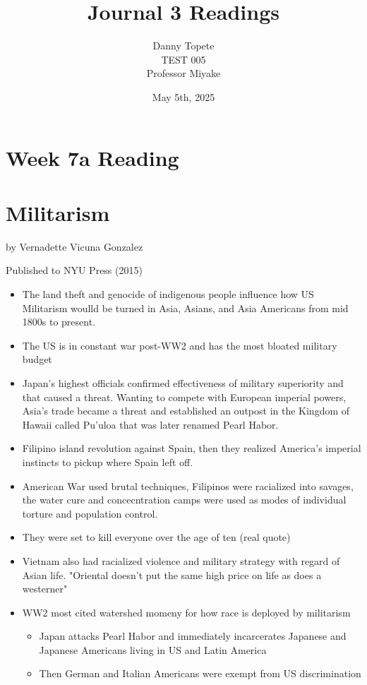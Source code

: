 \documentclass{article}
\title{Journal 3 Readings}
\author{Danny Topete\\ TEST 005\\ Professor Miyake}
\date{May 5th, 2025}
\begin{document}
\maketitle


  \section*{Week 7a Reading}
  \section{Militarism}
  by Vernadette Vicuna Gonzalez

  Published to NYU Press (2015)

  \begin{itemize}
    \item The land theft and genocide of indigenous people
      influence how US Militarism woulld be turned
      in Asia, Asians, and Asia Americans from mid 1800s to present.
    \item The US is in constant war post-WW2 and has the most bloated military budget
    \item Japan's highest officials confirmed
      effectiveness of military superiority and that caused a threat.
      Wanting to compete with European imperial powers, Asia's trade became a threat and
      established an outpost in the Kingdom of Hawaii called Pu'uloa that was
      later renamed Pearl Habor.
    \item Filipino island revolution against Spain, then they realized
      America's imperial instincts to pickup where Spain left off.
    \item American War used brutal techniques,
      Filipinos were racialized into savages, the water cure
      and concecntration camps were used as modes of individual torture and population control.
    \item They were set to kill everyone over the age of ten (real quote)
    \item Vietnam also had racialized violence and military strategy with
      regard of Asian life. "Oriental doesn't put the same high price on life as does a westerner"
    \item WW2 most cited watershed momeny for how race is deployed by militarism
      \begin{itemize}
        \item Japan attacks Pearl Habor and immediately incarcerates Japanese and Japanese Americans
          living in US and Latin America
        \item Then German and Italian Americans were exempt from US discrimination
      \end{itemize}
  \end{itemize}
\end{document}

